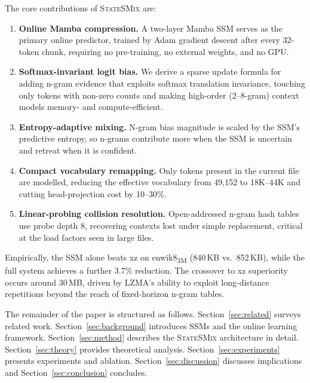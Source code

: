 \documentclass[10pt,twocolumn]{article}
\newcommand{\ssmcomp}{\textsc{StateSMix}}
\begin{document}
The core contributions of \ssmcomp{} are:
\begin{enumerate}
\item \textbf{Online Mamba compression.}  A two-layer Mamba SSM serves
  as the primary online predictor, trained by Adam gradient descent
  after every 32-token chunk, requiring no pre-training, no external
  weights, and no GPU.

\item \textbf{Softmax-invariant logit bias.}  We derive a sparse update
  formula for adding n-gram evidence that exploits softmax translation
  invariance, touching only tokens with non-zero counts and making
  high-order (2--8-gram) context models memory- and compute-efficient.

\item \textbf{Entropy-adaptive mixing.}  N-gram bias magnitude is scaled
  by the SSM's predictive entropy, so n-grams contribute more when the
  SSM is uncertain and retreat when it is confident.

\item \textbf{Compact vocabulary remapping.}  Only tokens present in
  the current file are modelled, reducing the effective vocabulary
  from 49{,}152 to 18K--44K and cutting head-projection cost by
  10--30\%.

\item \textbf{Linear-probing collision resolution.}  Open-addressed
  n-gram hash tables use probe depth 8, recovering contexts lost under
  simple replacement, critical at the load factors seen in large files.
\end{enumerate}

Empirically, the SSM alone beats xz on enwik8\textsubscript{3M}
(840\,KB vs.\ 852\,KB), while the full system achieves a further
3.7\% reduction.  The crossover to xz superiority occurs around 30\,MB,
driven by LZMA's ability to exploit long-distance repetitions beyond the
reach of fixed-horizon n-gram tables.

The remainder of the paper is structured as follows.
Section~\ref{sec:related} surveys related work.
Section~\ref{sec:background} introduces SSMs and the online learning
framework.
Section~\ref{sec:method} describes the \ssmcomp{} architecture in
detail.
Section~\ref{sec:theory} provides theoretical analysis.
Section~\ref{sec:experiments} presents experiments and ablation.
Section~\ref{sec:discussion} discusses implications and
Section~\ref{sec:conclusion} concludes.

\end{document}

